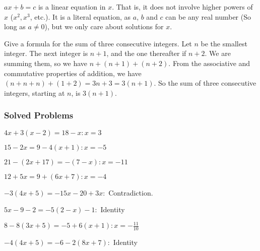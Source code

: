 \documentclass[crop=false,class=book,oneside]{standalone}                      %
\begin{document}
        \begin{remark}
        $ax+b=c$ is a linear equation in $x$. That is, it does not involve higher powers of $x$ ($x^{2},x^{3}$, etc.). It is a literal
        equation, as $a$, $b$ and $c$ can be any real number (So long as $a\ne 0$), but we only care about solutions for $x$.
        \end{remark}
        \begin{example}
            Give a formula for the sum of three consecutive integers. Let $n$ be the smallest integer. The next integer is $n+1$, and the one
            thereafter if $n+2$. We are summing them, so we have $n+(n+1)+(n+2)$. From the associative and commutative properties of addition,
            we have $(n+n+n)+(1+2)=3n+3=3(n+1)$. So the sum of three consecutive integers, starting at $n$, is $3(n+1)$.
        \end{example}
        \subsubsection{Solved Problems}
        \begin{enumerate}
            \begin{multicols}{2}
                \item $4x+3(x-2)=18-x:x=3$
                \item $15-2x=9-4(x+1):x=-5$
                \item $21-(2x+17)=-(7-x):x=-11$
                \item $12+5x=9+(6x+7):x=-4$
                \item $-3(4x+5)=-15x-20+3x:$ Contradiction.
                \item $5x-9-2=-5(2-x)-1:$ Identity
                \item $8-8(3x+5)=-5+6(x+1):x=-\frac{11}{10}$
                \item $-4(4x+5)=-6-2(8x+7):$ Identity
            \end{multicols}
        \end{enumerate}
\end{document}
